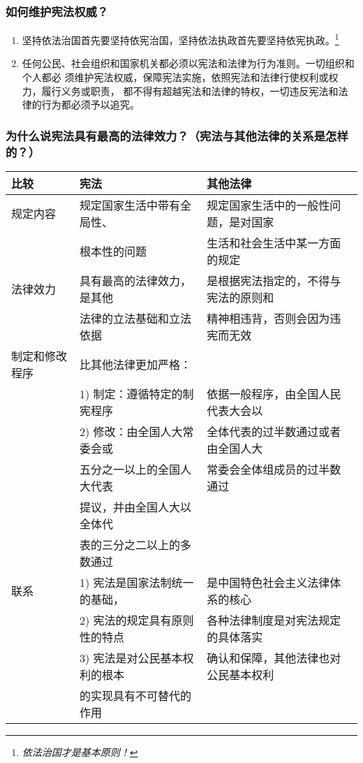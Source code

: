 \documentclass[11pt]{article}
\begin{document}
\subsubsection{如何维护宪法权威？}
\label{sec:orgdab2a68}
\begin{enumerate}
\item 坚持依法治国首先要坚持依宪治国，坚持依法执政首先要坚持依宪执政。\footnote{\emph{依法治国才是基本原则！}}
\item 任何公民、社会组织和国家机关都必须以宪法和法律为行为准则。一切组织和个人都必
须维护宪法权威，保障宪法实施，依照宪法和法律行使权利或权力，履行义务或职责，
都不得有超越宪法和法律的特权，一切违反宪法和法律的行为都必须予以追究。
\end{enumerate}
\subsubsection{为什么说宪法具有最高的法律效力？（宪法与其他法律的关系是怎样的？）}
\label{sec:orgfd405f3}
\begin{center}
\begin{tabular}{lll}
\hline
\hline
比较 & 宪法 & 其他法律\\
\hline
\hline
规定内容 & 规定国家生活中带有全局性、 & 规定国家生活中的一般性问题，是对国家\\
 & 根本性的问题 & 生活和社会生活中某一方面的规定\\
\hline
法律效力 & 具有最高的法律效力，是其他 & 是根据宪法指定的，不得与宪法的原则和\\
 & 法律的立法基础和立法依据 & 精神相违背，否则会因为违宪而无效\\
\hline
制定和修改程序 & 比其他法律更加严格： & \\
 & 1) 制定：遵循特定的制宪程序 & 依据一般程序，由全国人民代表大会以\\
 & 2) 修改：由全国人大常委会或 & 全体代表的过半数通过或者由全国人大\\
 & 五分之一以上的全国人大代表 & 常委会全体组成员的过半数通过\\
 & 提议，并由全国人大以全体代 & \\
 & 表的三分之二以上的多数通过 & \\
\hline
\hline
联系 & 1) 宪法是国家法制统一的基础， & 是中国特色社会主义法律体系的核心\\
 & 2) 宪法的规定具有原则性的特点 & 各种法律制度是对宪法规定的具体落实\\
 & 3) 宪法是对公民基本权利的根本 & 确认和保障，其他法律也对公民基本权利\\
 & 的实现具有不可替代的作用 & \\
\hline
\hline
\end{tabular}
\end{center}
\end{document}

